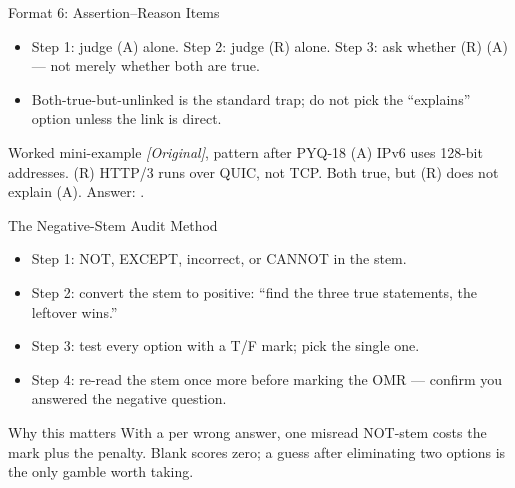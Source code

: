 \documentclass[aspectratio=169]{beamer}
\begin{document}
\begin{frame}{Format 6: Assertion--Reason Items}
  \begin{itemize}
    \item Step 1: judge (A) alone. Step 2: judge (R) alone. Step 3: ask
      whether (R)  (A) --- not merely whether both are true.
    \item Both-true-but-unlinked is the standard trap; do not pick the
      ``explains'' option unless the link is direct.
  \end{itemize}
  \begin{exampleblock}{Worked mini-example \textit{[Original]}, pattern after PYQ-18}
    (A) IPv6 uses 128-bit addresses. (R) HTTP/3 runs over QUIC, not TCP.
    Both true, but (R) does not explain (A). Answer: .
  \end{exampleblock}
\end{frame}

\begin{frame}{The Negative-Stem Audit Method}
  \begin{itemize}
    \item Step 1:  NOT, EXCEPT, incorrect, or CANNOT in the
      stem.
    \item Step 2: convert the stem to positive: ``find the three true
      statements, the leftover wins.''
    \item Step 3: test every option with a T/F mark; pick the single
       one.
    \item Step 4: re-read the stem once more before marking the OMR ---
      confirm you answered the negative question.
  \end{itemize}
  \begin{alertblock}{Why this matters}
    With a  per wrong answer, one misread NOT-stem
    costs the mark plus the penalty. Blank scores zero; a guess after
    eliminating two options is the only gamble worth taking.
  \end{alertblock}
\end{frame}
\end{document}
